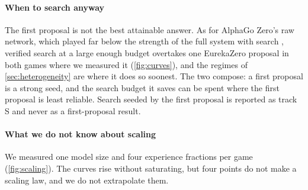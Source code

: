 \paragraph{When to search anyway} The first proposal is not the best attainable answer. As for
AlphaGo Zero's raw network, which played far below the strength of the full system with search
\citep{silver2017zero}, verified search at a large enough budget overtakes one EurekaZero
proposal in both games where we measured it (\cref{fig:curves}), and the regimes of \cref{sec:heterogeneity} are where it
does so soonest. The two compose: a first proposal is a strong seed, and the search budget it saves
can be spent where the first proposal is least reliable. Search seeded by the first proposal is
reported as track S and never as a first-proposal result.

\paragraph{What we do not know about scaling} We measured one model size and four experience
fractions per game (\cref{fig:scaling}). The curves rise without saturating, but four points do not
make a scaling law, and we do not extrapolate them.
